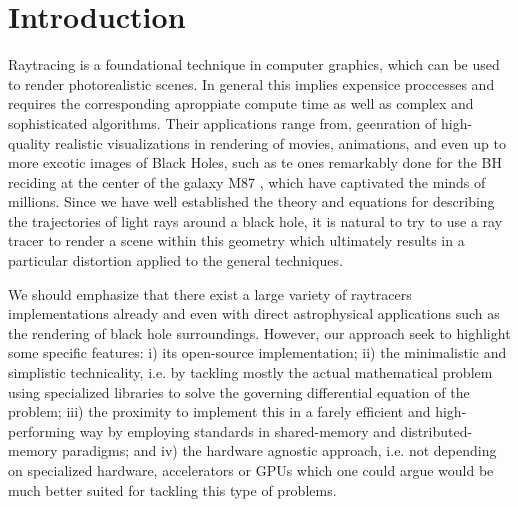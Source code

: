 


\section{Introduction}
\label{sec:intro}



Raytracing is a foundational technique in computer graphics, which can be used to render photorealistic scenes.
In general this implies expensice proccesses and requires the corresponding aproppiate compute time
as well as complex and sophisticated algorithms.
Their applications range from, geenration of high-quality realistic visualizations
in rendering of movies, animations, and even up to more excotic images of Black Holes,
such as te ones remarkably done for the BH reciding at the center of the galaxy M87 \cite{M87_EHT_i},
which have captivated the minds of millions.
Since we have well established the theory and equations for describing the trajectories of light rays around a black hole, it is natural to try to use a ray tracer to render a scene within this geometry which ultimately results in a particular distortion applied to the general techniques.

We should emphasize that there exist a large variety of raytracers implementations already 
\cite{sharma2023mahakalapythonbasedmodularraytracing,imbens2023graphicalprocessinggeodesicpropagation,10.2312:vmv.20221208,10.2312/EGPGV/EGPGV12/051-060,7539599_OSPRay,James_2015}
and even with direct astrophysical applications such as the rendering of black hole surroundings.
However, our approach seek to highlight some specific features:
i) its open-source implementation;
ii) the minimalistic and simplistic technicality, i.e. by tackling
mostly the actual mathematical problem using specialized libraries
to solve the governing differential equation of the problem;
iii) the proximity to implement this in a farely efficient and high-performing
way by employing standards in shared-memory and distributed-memory paradigms;
and iv) the hardware agnostic approach, i.e. not depending on specialized hardware, accelerators or GPUs which one could argue would be much better suited for tackling this type of problems.

